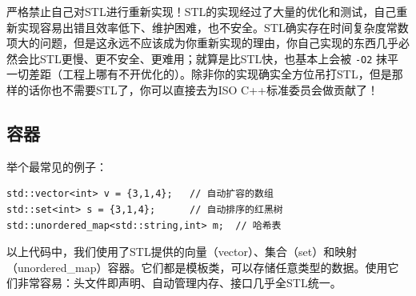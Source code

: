 \begin{warning}
  严格禁止自己对STL进行重新实现！STL的实现经过了大量的优化和测试，自己重新实现容易出错且效率低下、维护困难，也不安全。STL确实存在时间复杂度常数项大的问题，但是这永远不应该成为你重新实现的理由，你自己实现的东西几乎必然会比STL更慢、更不安全、更难用；就算是比STL快，也基本上会被 \texttt{-O2} 抹平一切差距（工程上哪有不开优化的）。除非你的实现确实全方位吊打STL，但是那样的话你也不需要STL了，你可以直接去为ISO C++标准委员会做贡献了！
\end{warning}

\subsection{容器}

举个最常见的例子：
\begin{verbatim}
std::vector<int> v = {3,1,4};   // 自动扩容的数组
std::set<int> s = {3,1,4};      // 自动排序的红黑树
std::unordered_map<std::string,int> m;  // 哈希表
\end{verbatim}
以上代码中，我们使用了STL提供的向量（vector）、集合（set）和映射（unordered\_map）容器。它们都是模板类，可以存储任意类型的数据。使用它们非常容易：头文件即声明、自动管理内存、接口几乎全STL统一。


